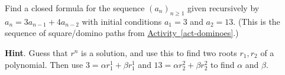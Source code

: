 \documentclass{book}
\begin{document}
\setcounter{cpjt}{149}
\addtocounter{cpjt}{-1}
\begin{activity}\label{activity-142}
\hypertarget{p-953}{}%
Find a closed formula for the sequence \((a_n)_{n \ge 1}\) given recursively by \(a_n = 3a_{n-1} + 4a_{n-2}\) with initial conditions \(a_1 = 3\) and \(a_2 = 13\).  (This is the sequence of square/domino paths from \hyperref[act-dominoes]{Activity~\ref{act-dominoes}}.)%
\par\smallskip%
\noindent\textbf{Hint}.\hypertarget{hint-108}{}\quad%
\hypertarget{p-954}{}%
Guess that \(r^n\) is a solution, and use this to find two roots \(r_1, r_2\) of a polynomial.  Then use \(3 = \alpha r_1^1 + \beta r_1^1\) and \(13 = \alpha r_2^2 + \beta r_2^2\) to find \(\alpha\) and \(\beta\).%
\end{activity}

\clearpage
\end{document}
